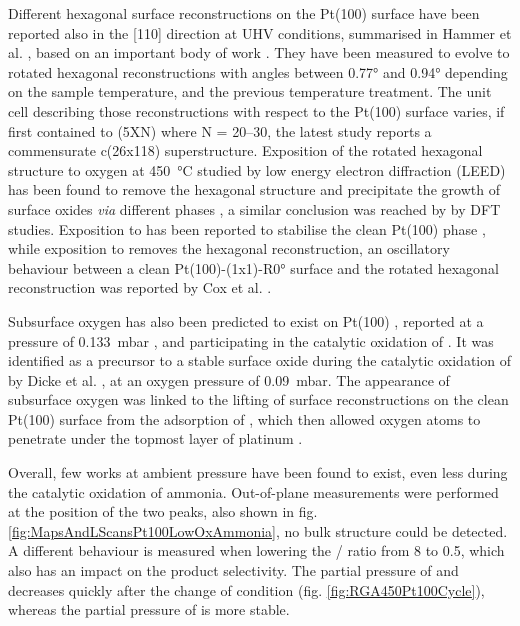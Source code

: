 Different hexagonal surface reconstructions on the Pt(100) surface have been reported also in the [110] direction at UHV conditions, summarised in Hammer et al. \parencite*{Hammer2016}, based on an important body of work \parencite{Heilmann1979, Vanhove1981, Heinz1982, Mase1992, Kuhnke1992, Borg1994, VanBeurden2004, Havu2010}.
They have been measured to evolve to rotated hexagonal reconstructions with angles between \ang{0.77} and \ang{0.94} depending on the sample temperature, and the previous temperature treatment.
The unit cell describing those reconstructions with respect to the Pt(100) surface varies, if first contained to (5XN) where N = 20–30, the latest study reports a commensurate c(26x118) superstructure.
Exposition of the rotated hexagonal structure to oxygen at \qty{450}{\degreeCelsius} studied by low energy electron diffraction (LEED) has been found to remove the hexagonal structure and precipitate the growth of surface oxides \textit{via} different phases \parencite{BradleyShumbera2007, BradleyShumbera2007a}, a similar conclusion was reached by \cite{Deskins2005} by DFT studies.
Exposition to  has been reported to stabilise the clean Pt(100) phase \parencite{Heinz1982}, while exposition to  removes the hexagonal reconstruction, an oscillatory behaviour between a clean Pt(100)-(1x1)-R\ang{0} surface and the rotated hexagonal reconstruction was reported by Cox et al. \parencite*{Cox1983}.

Subsurface oxygen has also been predicted to exist on Pt(100) \parencite{Gu2007}, reported at a pressure of \qty{0.133}{\milli\bar} \parencite{McMillan2005}, and participating in the catalytic oxidation of .
It was identified as a precursor to a stable surface oxide during the catalytic oxidation of  by Dicke et al. \parencite*{Dicke2000}, at an oxygen pressure of \qty{0.09}{\milli\bar}.
The appearance of subsurface oxygen was linked to the lifting of surface reconstructions on the clean Pt(100) surface from the adsorption of , which then allowed oxygen atoms to penetrate under the topmost layer of platinum \parencite{Rotermund1993, Lauterbach1994}.

Overall, few works at ambient pressure have been found to exist, even less during the catalytic oxidation of ammonia.
Out-of-plane measurements were performed at the position of the two peaks, also shown in fig. \ref{fig:MapsAndLScansPt100LowOxAmmonia}, no bulk structure could be detected.
A different behaviour is measured when lowering the / ratio from \num{8} to \num{0.5}, which also has an impact on the product selectivity.
The partial pressure of  and  decreases quickly after the change of condition (fig. \ref{fig:RGA450Pt100Cycle}), whereas the partial pressure of  is more stable.

